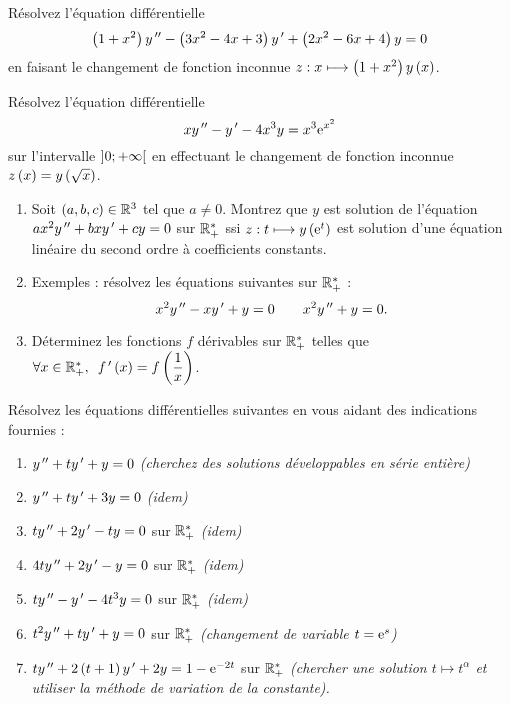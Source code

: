 \begin{exos}
Résolvez l'équation différentielle \[\left(1+x^2\right)y^{\,\prime\prime}-\left(3x^2-4x+3\right)y^{\,\prime}+\left(2x^2-6x+4\right)y=0\] en faisant le changement de fonction inconnue \(z:x\longmapsto\left(1+x^2\right)y\left(x\right)\).
\end{exos}

\begin{exoss}
Résolvez l'équation différentielle \[xy^{\,\prime\prime}-y^{\,\prime}-4x^3y=x^3\mathrm{e}^{x^2}\] sur l'intervalle \(\left]0;+\infty\right[\) en effectuant le changement de fonction inconnue \(z\left(x\right)=y\left(\sqrt{x}\right)\).
\end{exoss}

\begin{exoss}
\begin{enumerate}
    \item Soit \(\left(a,b,c\right)\in\mathbb{R}^3\) tel que \(a\not=0\). Montrez que \(y\) est solution de l'équation \(ax^2y^{\,\prime\prime}+bxy^{\,\prime}+cy=0\) sur \(\mathbb{R}_+^*\) ssi \(z:t\longmapsto y\left(\mathrm{e}^{t}\right)\) est solution d'une équation linéaire du second ordre à coefficients constants. \\
    \item Exemples : résolvez les équations suivantes sur \(\mathbb{R}_+^*\) : \[x^2y^{\,\prime\prime}-xy^{\,\prime}+y=0\qquad x^2y^{\,\prime\prime}+y=0.\]
    \item Déterminez les fonctions \(f\) dérivables sur \(\mathbb{R}_+^*\) telles que \(\quantifs{\forall x\in\Rps}f\prim\paren{x}=f\paren{\dfrac{1}{x}}\).
\end{enumerate}
\end{exoss}

\begin{exoss}
Résolvez les équations différentielles suivantes en vous aidant des indications fournies :

\begin{enumerate}
    \item \(y^{\,\prime\prime}+ty^{\,\prime}+y=0\) \textit{(cherchez des solutions développables en série entière)} \\
    \item \(y^{\,\prime\prime}+ty^{\,\prime}+3y=0\) \textit{(idem)} \\
    \item \(ty^{\,\prime\prime}+2y^{\,\prime}-ty=0\) sur \(\mathbb{R}_+^*\) \textit{(idem)} \\
    \item \(4ty^{\,\prime\prime}+2y^{\,\prime}-y=0\) sur \(\mathbb{R}_+^*\) \textit{(idem)} \\
    \item \(ty^{\,\prime\prime}-y^{\,\prime}-4t^3y=0\) sur \(\mathbb{R}_+^*\) \textit{(idem)} \\
    \item \(t^2y^{\,\prime\prime}+ty^{\,\prime}+y=0\) sur \(\mathbb{R}_+^*\) \textit{(changement de variable \(t=\mathrm{e}^{s}\))} \\
    \item \(ty^{\,\prime\prime}+2\left(t+1\right)y^{\,\prime}+2y=1-\mathrm{e}^{-2t}\) sur \(\mathbb{R}_+^*\) \textit{(chercher une solution \(t\mapsto t^\alpha\) et utiliser la méthode de variation de la constante).}
\end{enumerate}
\end{exoss}

